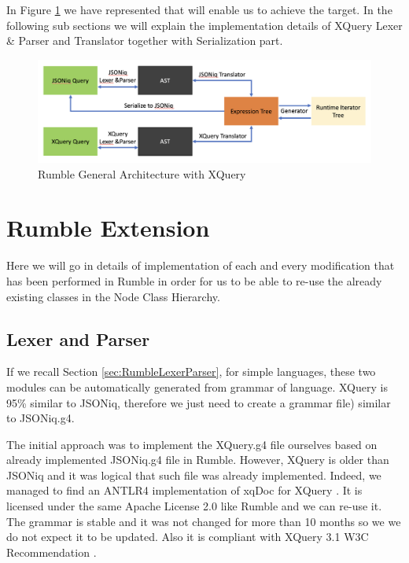 In Figure \ref{fig:Rumble_General_Architecture_With_XQuery} we have represented that will enable us to achieve the target. In the following sub sections we will explain the implementation details of XQuery Lexer \& Parser and Translator together with Serialization part. 

\begin{figure}[h!]
	\includegraphics[width=\linewidth]{double_parsing_architecture.png}
	\vspace*{-5mm}
	\caption{Rumble General Architecture with XQuery}
	\label{fig:Rumble_General_Architecture_With_XQuery}
\end{figure}

\section{Rumble Extension}
Here we will go in details of implementation of each and every modification that has been performed in Rumble in order for us to be able to re-use the already existing classes in the Node Class Hierarchy. 

\subsection{Lexer and Parser}
If we recall Section \ref{sec:RumbleLexerParser}, for simple languages, these two modules can be automatically generated from grammar of language. XQuery is 95\% similar to JSONiq, therefore we just need to create a grammar file) similar to JSONiq.g4. 

The initial approach was to implement the XQuery.g4 file ourselves based on already implemented JSONiq.g4 file in Rumble. However, XQuery is older than JSONiq and it was logical that such file was already implemented. Indeed, we managed to find an ANTLR4 implementation of xqDoc for XQuery \cite{XqueryGrammar}. It is licensed under the same Apache License 2.0 like Rumble and we can re-use it. The grammar is stable and it was not changed for more than 10 months so we we do not expect it to be updated. Also it is compliant with XQuery 3.1 W3C Recommendation \cite{XQueryRecommendation}. 

